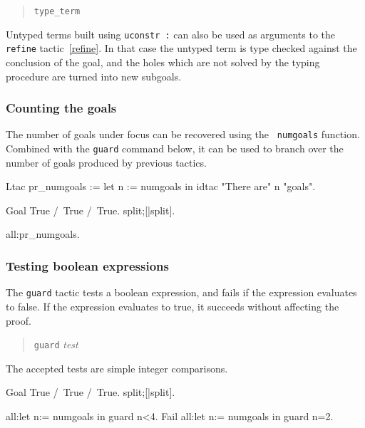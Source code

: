 \begin{quote}
{\tt type\_term} {\term}
\end{quote}

Untyped terms built using {\tt uconstr :} can also be used as
arguments to the {\tt refine} tactic~\ref{refine}. In that case the
untyped term is type checked against the conclusion of the goal, and
the holes which are not solved by the typing procedure are turned into
new subgoals.

\subsubsection[Counting the goals]{Counting the goals}

The number of goals under focus can be recovered using the {\tt
  numgoals} function. Combined with the {\tt guard} command below, it
can be used to branch over the number of goals produced by previous tactics.

\begin{coq_example*}
Ltac pr_numgoals := let n := numgoals in idtac "There are" n "goals".

Goal True /\ True /\ True.
split;[|split].
\end{coq_example*}
\begin{coq_example}
all:pr_numgoals.
\end{coq_example}

\subsubsection[Testing boolean expressions]{Testing boolean expressions}

The {\tt guard} tactic tests a boolean expression, and fails if the expression evaluates to false. If the expression evaluates to true, it succeeds without affecting the proof.

\begin{quote}
{\tt guard} {\it test}
\end{quote}

The accepted tests are simple integer comparisons.

\begin{coq_example*}
Goal True /\ True /\ True.
split;[|split].
\end{coq_example*}
\begin{coq_example}
all:let n:= numgoals in guard n<4.
Fail all:let n:= numgoals in guard n=2.
\end{coq_example}
\begin{ErrMsgs}

\item {}

\end{ErrMsgs}

